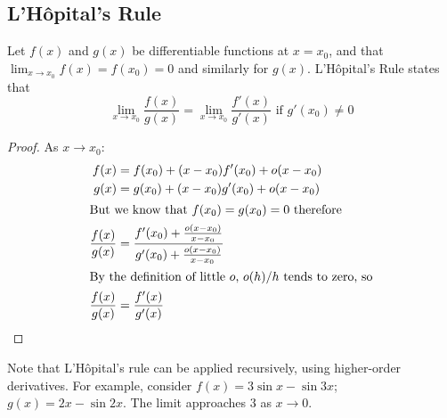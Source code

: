 \subsection{L'H\^opital's Rule}
Let \(f(x)\) and \(g(x)\) be differentiable functions at \(x=x_0\), and that \(\lim_{x\to x_0} f(x) = f(x_0) = 0\) and similarly for \(g(x)\).
L'H\^opital's Rule states that
\[
	\lim_{x\to x_0} \frac{f(x)}{g(x)} = \lim_{x\to x_0} \frac{f'(x)}{g'(x)} \text{ if } g'(x_0) \neq 0
\]
\begin{proof}
	As \(x \to x_0\):
	\begin{align*}
		f(x)              & = f(x_0) + (x-x_0) f'(x_0) + o(x-x_0)                                       \\
		g(x)              & = g(x_0) + (x-x_0) g'(x_0) + o(x-x_0)                                       \\
		\intertext{But we know that \(f(x_0)=g(x_0)=0\) therefore}
		\frac{f(x)}{g(x)} & = \frac{f'(x_0) + \frac{o(x-x_0)}{x-x_0}}{g'(x_0) + \frac{o(x-x_0)}{x-x_0}} \\
		\intertext{By the definition of little \(o\), \(o(h)/h\) tends to zero, so}
		\frac{f(x)}{g(x)} & = \frac{f'(x)}{g'(x)}
	\end{align*}
\end{proof}
Note that L'H\^opital's rule can be applied recursively, using higher-order derivatives.
For example, consider \(f(x) = 3\sin x - \sin 3x\); \(g(x) = 2x - \sin 2x\).
The limit approaches 3 as \(x \to 0\).
